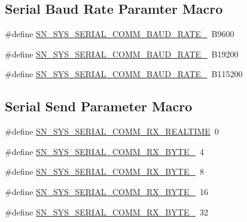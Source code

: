 \subsection*{Serial Baud Rate Paramter Macro}
\begin{DoxyCompactItemize}
\item 
\#define \hyperlink{group__SYSTEM__SERIAL__COMM_ga8ef896af26917008892ad9f98480cced}{S\+N\+\_\+\+S\+Y\+S\+\_\+\+S\+E\+R\+I\+A\+L\+\_\+\+C\+O\+M\+M\+\_\+\+B\+A\+U\+D\+\_\+\+R\+A\+T\+E\+\_}~B9600
\item 
\#define \hyperlink{group__SYSTEM__SERIAL__COMM_gabbea68264d49ba7b3fd3ea0af2d5871d}{S\+N\+\_\+\+S\+Y\+S\+\_\+\+S\+E\+R\+I\+A\+L\+\_\+\+C\+O\+M\+M\+\_\+\+B\+A\+U\+D\+\_\+\+R\+A\+T\+E\+\_}~B19200
\item 
\#define \hyperlink{group__SYSTEM__SERIAL__COMM_gac225ef6708a36c14757361c4f496f218}{S\+N\+\_\+\+S\+Y\+S\+\_\+\+S\+E\+R\+I\+A\+L\+\_\+\+C\+O\+M\+M\+\_\+\+B\+A\+U\+D\+\_\+\+R\+A\+T\+E\+\_}~B115200
\end{DoxyCompactItemize}
\subsection*{Serial Send Parameter Macro}
\begin{DoxyCompactItemize}
\item 
\#define \hyperlink{group__SYSTEM__SERIAL__COMM_ga45345dabcfb671abba160a3dac350670}{S\+N\+\_\+\+S\+Y\+S\+\_\+\+S\+E\+R\+I\+A\+L\+\_\+\+C\+O\+M\+M\+\_\+\+R\+X\+\_\+\+R\+E\+A\+L\+T\+I\+ME}~0
\item 
\#define \hyperlink{group__SYSTEM__SERIAL__COMM_ga20e8092429292afa4348544ee9fafec3}{S\+N\+\_\+\+S\+Y\+S\+\_\+\+S\+E\+R\+I\+A\+L\+\_\+\+C\+O\+M\+M\+\_\+\+R\+X\+\_\+\+B\+Y\+T\+E\+\_}~4
\item 
\#define \hyperlink{group__SYSTEM__SERIAL__COMM_gaeeb374cea7f99086bd693aa158af8dc8}{S\+N\+\_\+\+S\+Y\+S\+\_\+\+S\+E\+R\+I\+A\+L\+\_\+\+C\+O\+M\+M\+\_\+\+R\+X\+\_\+\+B\+Y\+T\+E\+\_}~8
\item 
\#define \hyperlink{group__SYSTEM__SERIAL__COMM_ga56161a71858040bee49e45caeb42787a}{S\+N\+\_\+\+S\+Y\+S\+\_\+\+S\+E\+R\+I\+A\+L\+\_\+\+C\+O\+M\+M\+\_\+\+R\+X\+\_\+\+B\+Y\+T\+E\+\_}~16
\item 
\#define \hyperlink{group__SYSTEM__SERIAL__COMM_ga532ba920d82c8b8bf35997df3c732d4c}{S\+N\+\_\+\+S\+Y\+S\+\_\+\+S\+E\+R\+I\+A\+L\+\_\+\+C\+O\+M\+M\+\_\+\+R\+X\+\_\+\+B\+Y\+T\+E\+\_}~32
\end{DoxyCompactItemize}
